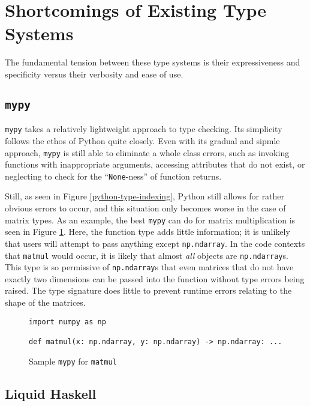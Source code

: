 \documentclass{book}
\begin{document}
\section{Shortcomings of Existing Type Systems}

The fundamental tension between these type systems is their expressiveness and specificity versus their verbosity and ease of use.

\subsection{\texttt{mypy}}

\texttt{mypy} takes a relatively lightweight approach to type checking. Its simplicity follows the ethos of Python quite closely. Even with its gradual  and sipmle approach, \texttt{mypy} is still able to eliminate a whole class errors, such as invoking functions with inappropriate arguments, accessing attributes that do not exist, or neglecting to check for the ``\texttt{None}-ness'' of function returns.

Still, as seen in Figure \ref{python-type-indexing}, Python still allows for rather obvious errors to occur, and this situation only becomes worse in the case of matrix types. As an example, the best \texttt{mypy} can do for matrix multiplication is seen in Figure \ref{python-type-matmul}. Here, the function type adds little information; it is unlikely that users will attempt to pass anything except \texttt{np.ndarray}. In the code contexts that \texttt{matmul} would occur, it is likely that almost \textit{all} objects are \texttt{np.ndarray}s. This type is so permissive of \texttt{np.ndarray}s that even matrices that do not have exactly two dimensions can be passed into the function without type errors being raised. The type signature does little to prevent runtime errors relating to the shape of the matrices.

\begin{figure}
    \centering
    \begin{verbatim}
import numpy as np

def matmul(x: np.ndarray, y: np.ndarray) -> np.ndarray: ...\end{verbatim}
    \caption{Sample \texttt{mypy} for \texttt{matmul}}
    \label{python-type-matmul}
\end{figure}


\subsection{Liquid Haskell}
\end{document}
